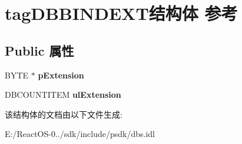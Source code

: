 \hypertarget{structtag_d_b_b_i_n_d_e_x_t}{}\section{tag\+D\+B\+B\+I\+N\+D\+E\+X\+T结构体 参考}
\label{structtag_d_b_b_i_n_d_e_x_t}
\subsection*{Public 属性}
\begin{DoxyCompactItemize}
\item 
\mbox{\label{structtag_d_b_b_i_n_d_e_x_t_ad59523692ff964e3c75c332405887e9d}} 
B\+Y\+TE $\ast$ {\bfseries p\+Extension}
\item 
\mbox{\label{structtag_d_b_b_i_n_d_e_x_t_aec46112c7de085a199167abb5c0e9c2d}} 
D\+B\+C\+O\+U\+N\+T\+I\+T\+EM {\bfseries ul\+Extension}
\end{DoxyCompactItemize}


该结构体的文档由以下文件生成\+:\begin{DoxyCompactItemize}
\item 
E\+:/\+React\+O\+S-\/0../sdk/include/psdk/dbs.\+idl\end{DoxyCompactItemize}
